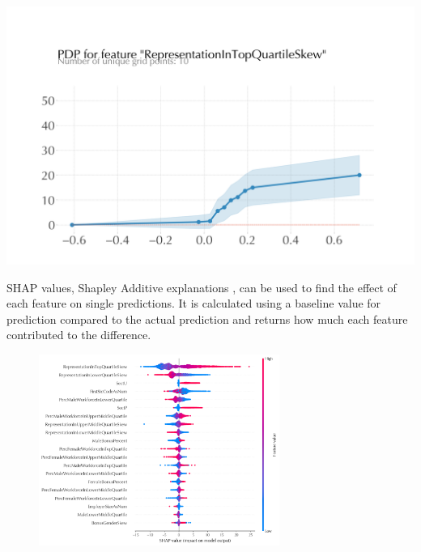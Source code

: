 \begin{centering}
    \includegraphics[width=1.1\linewidth]{images/DiffMedianHourlyPercent-RepresentationInTopQuartileSkew-pdp.png}
    \label{fig:pdp-top-median-rf}
\end{centering}

SHAP values, Shapley Additive explanations \cite{Lundberg2017}, can be used to find the effect of each feature on single predictions. It is calculated using a baseline value for prediction compared to the actual prediction and returns how much each feature contributed to the difference.

\begin{figure}
    \centering
    \includegraphics[width=0.7\textwidth]{images/median-shap.png}
    \label{fig:shap-median-rf}
\end{figure}

